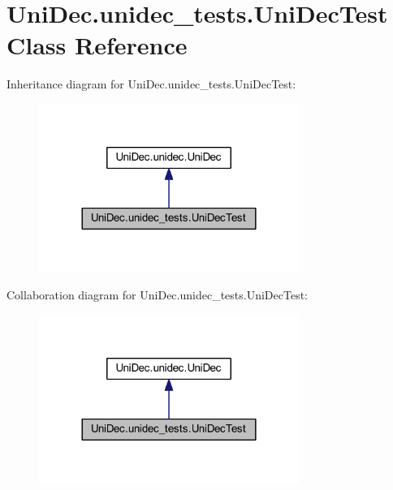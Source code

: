 \hypertarget{class_uni_dec_1_1unidec__tests_1_1_uni_dec_test}{}\section{Uni\+Dec.\+unidec\+\_\+tests.\+Uni\+Dec\+Test Class Reference}
\label{class_uni_dec_1_1unidec__tests_1_1_uni_dec_test}


Inheritance diagram for Uni\+Dec.\+unidec\+\_\+tests.\+Uni\+Dec\+Test\+:\nopagebreak
\begin{figure}[H]
\begin{center}
\leavevmode
\includegraphics[width=240pt]{class_uni_dec_1_1unidec__tests_1_1_uni_dec_test__inherit__graph}
\end{center}
\end{figure}


Collaboration diagram for Uni\+Dec.\+unidec\+\_\+tests.\+Uni\+Dec\+Test\+:\nopagebreak
\begin{figure}[H]
\begin{center}
\leavevmode
\includegraphics[width=240pt]{class_uni_dec_1_1unidec__tests_1_1_uni_dec_test__coll__graph}
\end{center}
\end{figure}

